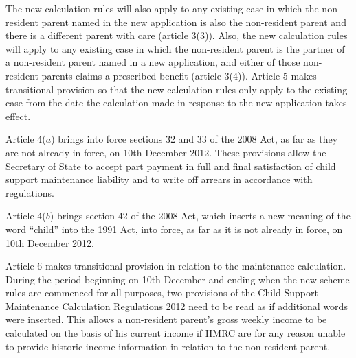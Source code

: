\documentclass[12pt,a4paper]{article}
\begin{document}
The new calculation rules will also apply to any existing case in which the non-resident parent named in the new application is also the non-resident parent and there is a different parent with care (article 3(3)). Also, the new calculation rules will apply to any existing case in which the non-resident parent is the partner of a non-resident parent named in a new application, and either of those non-resident parents claims a prescribed benefit (article 3(4)). Article 5 makes transitional provision so that the new calculation rules only apply to the existing case from the date the calculation made in response to the new application takes effect.

Article 4($a$)  brings into force sections 32 and 33 of the 2008 Act, as far as they are not already in force, on 10th December 2012. These provisions allow the Secretary of State to accept part payment in full and final satisfaction of child support maintenance liability and to write off arrears in accordance with regulations.

Article 4($b$)  brings section 42 of the 2008 Act, which inserts a new meaning of the word “child” into the 1991 Act, into force, as far as it is not already in force, on 10th December 2012.

Article 6 makes transitional provision in relation to the maintenance calculation. During the period beginning on 10th December and ending when the new scheme rules are commenced for all purposes, two provisions of the Child Support Maintenance Calculation Regulations 2012 need to be read as if additional words were inserted. This allows a non-resident parent’s gross weekly income to be calculated on the basis of his current income if HMRC are for any reason unable to provide historic income information in relation to the non-resident parent. 
\end{document}

